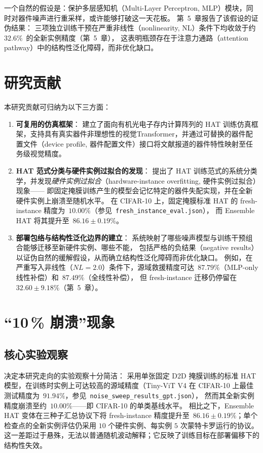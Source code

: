 一个自然的假设是：保护多层感知机（Multi-Layer Perceptron, MLP）模块，同时对器件噪声进行重采样，或许能够打破这一天花板。
第~5~章报告了该假设的证伪结果：
三项独立训练干预在严重非线性（nonlinearity, NL）条件下均收敛于约~$32.6\%$~的全新实例精度（第~5~章），
这表明瓶颈存在于注意力通路（attention pathway）中的结构性泛化障碍，而非优化缺口。

\section{研究贡献}

本研究贡献可归纳为以下三方面：

\begin{enumerate}
    \item \textbf{可复用的仿真框架}：
    建立了面向有机光电子存内计算阵列的 HAT 训练仿真框架，支持具有真实器件非理想性的视觉Transformer，并通过可替换的器件配置文件（device profile, 器件配置文件）接口将文献报道的器件特性映射至任务级视觉精度。
    
    \item \textbf{HAT 范式分类与硬件实例过拟合的发现}：
    提出了 HAT 训练范式的系统分类学，并发现\emph{硬件实例过拟合}（hardware-instance overfitting, 硬件实例过拟合）现象——
    即固定掩膜训练产生的模型会记忆特定的器件失配实现，并在全新硬件实例上崩溃至随机水平。
    在 CIFAR-10 上，固定掩膜标准 HAT 的 fresh-instance 精度为~$10.00\%$（参见~\texttt{fresh\_instance\_eval.json}），
    而 Ensemble HAT 将其提升至~$86.16\pm0.19\%$。
    
    \item \textbf{部署包络与结构性泛化边界的建立}：
    系统映射了哪些噪声模型与训练干预组合能够迁移至新硬件实例、哪些不能，
    包括严格的负结果（negative results）以证伪自然的缓解假设，从而确立结构性泛化障碍而非优化缺口。
    例如，在严重写入非线性（$NL=2.0$）条件下，源域救援精度可达~$87.79\%$（MLP-only 线性补偿）和~$87.49\%$（全线性补偿），
    但 fresh-instance 迁移仍停留在~$32.60\pm9.18\%$（第~5~章）。
\end{enumerate}

\section{``10\,\% 崩溃''现象}

\subsection{核心实验观察}

决定本研究走向的实验观察十分简洁：
采用单张固定 D2D 掩膜训练的标准 HAT 模型，在训练时实例上可达较高的源域精度（Tiny-ViT V4 在 CIFAR-10 上最佳测试精度为~$91.94\%$，参见~\texttt{noise\_sweep\_results\_gpt.json}），
然而其全新实例精度崩溃至约~$10.00\%$——即 CIFAR-10 的单类基线水平。
相比之下，Ensemble HAT 变体在三种子汇总协议下将 fresh-instance 精度提升至~$86.16\pm0.19\%$；单个检查点的全新实例评估仍采用 $10$ 个硬件实例、每实例 $5$ 次蒙特卡罗运行的协议。
这一差距过于悬殊，无法以普通随机波动解释；它反映了训练目标在部署偏移下的结构性失效。

